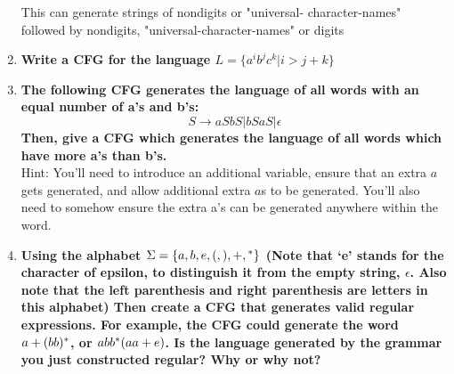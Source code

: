 \begin{enumerate}
This can generate strings of nondigits or "universal-
character-names" followed by nondigits, "universal-character-names" or
digits
\newpage
\item \textbf{Write a CFG for the language $L = \{ a^ib^jc^k | i>j+k\}$
}
\newpage
\item \textbf{The following CFG generates the language of all words with an
equal number of a's and b's:
\[S \rightarrow aSbS | bSaS | \epsilon\]
Then, give a CFG which generates the language of all words which have more
a's than b's.}\\
Hint: You'll need to introduce an additional variable, ensure that an extra
$a$ gets generated, and allow additional extra $a$s to be generated. You'll
also need to somehow ensure the extra a's can be generated anywhere within
the word.

\newpage
\item \textbf{Using the alphabet $\Sigma = \{a, b, e, (, ), +, {}^\ast\}$
(Note that `e' stands for the character of epsilon, to distinguish it from
the empty string, $\epsilon$. Also note that the left parenthesis and right
parenthesis are letters in this alphabet) Then create a CFG that generates
valid regular expressions. For example, the CFG could generate the word
$a+(bb){}^\ast$, or $abb{}^\ast(aa+e)$.  Is the language generated by the
grammar you just constructed regular? Why or why not?}

\end{enumerate}


